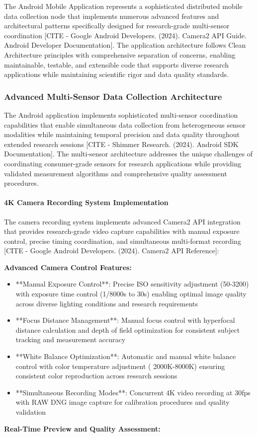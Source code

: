 \documentclass[12pt,a4paper]{report}
\begin{document}
The Android Mobile Application represents a sophisticated distributed mobile data collection node that implements
numerous advanced features and architectural patterns specifically designed for research-grade multi-sensor
coordination [CITE - Google Android Developers. (2024). Camera2 API Guide. Android Developer Documentation]. The
application architecture follows Clean Architecture principles with comprehensive separation of concerns, enabling
maintainable, testable, and extensible code that supports diverse research applications while maintaining scientific
rigor and data quality standards.

\subsubsection{Advanced Multi-Sensor Data Collection Architecture}

The Android application implements sophisticated multi-sensor coordination capabilities that enable simultaneous data
collection from heterogeneous sensor modalities while maintaining temporal precision and data quality throughout
extended research sessions [CITE - Shimmer Research. (2024). Android SDK Documentation]. The multi-sensor architecture
addresses the unique challenges of coordinating consumer-grade sensors for research applications while providing
validated measurement algorithms and comprehensive quality assessment procedures.

\paragraph{4K Camera Recording System Implementation}

The camera recording system implements advanced Camera2 API integration that provides research-grade video capture
capabilities with manual exposure control, precise timing coordination, and simultaneous multi-format
recording [CITE - Google Android Developers. (2024). Camera2 API Reference]:

\textbf{Advanced Camera Control Features:}

\begin{itemize}
\item **Manual Exposure Control**: Precise ISO sensitivity adjustment (50-3200) with exposure time control (1/8000s to 30s)
  enabling optimal image quality across diverse lighting conditions and research requirements
\item **Focus Distance Management**: Manual focus control with hyperfocal distance calculation and depth of field
  optimization for consistent subject tracking and measurement accuracy
\item **White Balance Optimization**: Automatic and manual white balance control with color temperature adjustment (
  2000K-8000K) ensuring consistent color reproduction across research sessions
\item **Simultaneous Recording Modes**: Concurrent 4K video recording at 30fps with RAW DNG image capture for calibration
  procedures and quality validation

\end{itemize}
\textbf{Real-Time Preview and Quality Assessment:}
\end{document}
